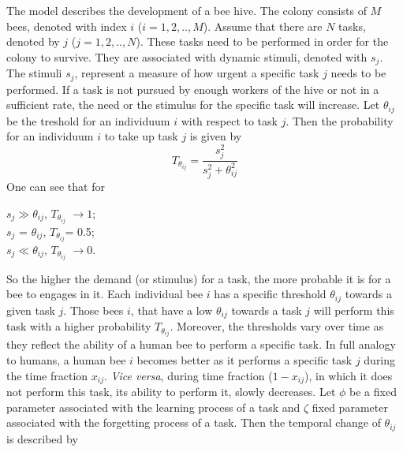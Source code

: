 
The model describes the development of a bee hive. The colony consists of $M$ bees, denoted with index $i$ ($i=1,2,..,M$). Assume that there are $N$ tasks, denoted by $j$ ($j=1,2,..,N$). These tasks need to be performed in order for the colony to survive. They are associated with dynamic stimuli, denoted with $s_{j}$. The stimuli $s_{j}$, represent a measure of how urgent a specific task $j$ needs to be performed. If a task is not pursued by enough workers of the hive or not in a sufficient rate, the need or the stimulus for the specific task will increase. Let $\theta_{ij}$ be the treshold for an individuum $i$ with respect to task $j$. Then the probability for an individuum $i$ to take up task $j$ is given by
\begin{equation} 
T_{\theta_{ij}}=\frac{s^{2}_{j}}{s^{2}_{j}+\theta^{2}_{ij}}
\end{equation}
One can see that for 
\begin{center}
$s_{j} \gg \theta_{ij}$, $T_{\theta_{ij}}$ $\to 1$; \\
$s_{j}$ = $\theta_{ij} $, $T_{\theta_{ij}}$= 0.5; \\
$s_{j} \ll \theta_{ij}$,  $T_{\theta_{ij}}$ $\to 0$.

\end{center}
 So the higher the demand (or stimulus) for a task, the more probable it is for a bee to engages in it. Each individual bee $i$ has a specific threshold $\theta_{ij}$ towards a given task $j$. Those bees $i$, that have a low $\theta_{ij}$ towards a task $j$ will perform this task with a higher probability $T_{\theta_{ij}}$. Moreover, the thresholds vary over time as they reflect the ability of a human bee to perform a specific task. In full analogy to humans, a human bee $i$ becomes better as it performs a specific task $j$ during the time fraction $x_{ij}$. \textit{Vice versa}, during time fraction ($1-x_{ij}$), in which it does not perform this task, its ability to perform it, slowly decreases. Let $\phi$ be a fixed parameter associated with the learning process of a task and $\zeta$  fixed parameter associated with the forgetting process of a task. Then the temporal change of $\theta_{ij}$ is described by

